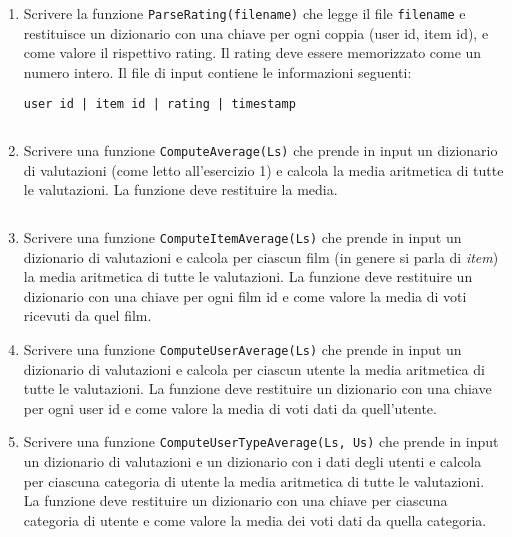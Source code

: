 \documentclass[11pt,a4]{article}
\newcommand{\mybox}[2]{$\quad$\fbox{
\begin{minipage}{#1cm}
\hfill\vspace{#2cm}
\end{minipage}
}}
\begin{document}
\begin{enumerate}
\item Scrivere la funzione {\tt ParseRating(filename)} che legge il file {\tt filename}
e restituisce un dizionario con una chiave per ogni coppia (user id, item id), e come valore il rispettivo rating. 
Il rating deve essere memorizzato come un numero intero.
Il file di input contiene le informazioni seguenti:
\begin{center}
{\tt user id | item id | rating | timestamp}
\end{center}

\mybox{15}{2}

\item Scrivere una funzione {\tt ComputeAverage(Ls)} che prende in input un dizionario di valutazioni (come letto all'esercizio 1) e calcola
la media aritmetica di tutte le valutazioni. La funzione deve restituire la media.

\mybox{15}{2}

\item Scrivere una funzione {\tt ComputeItemAverage(Ls)} che prende in input un dizionario di valutazioni e calcola
per ciascun film (in genere si parla di {\it item}) la media aritmetica di tutte le valutazioni. La funzione deve restituire un dizionario con una chiave
per ogni film id e come valore la media di voti ricevuti da quel film. 


\item Scrivere una funzione {\tt ComputeUserAverage(Ls)} che prende in input un dizionario di valutazioni e calcola
per ciascun utente la media aritmetica di tutte le valutazioni. La funzione deve restituire un dizionario con una chiave
per ogni user id e come valore la media di voti dati da quell'utente.


\item Scrivere una funzione {\tt ComputeUserTypeAverage(Ls, Us)} che prende in input un dizionario di valutazioni e un dizionario con i dati degli utenti e calcola
per ciascuna categoria di utente la media aritmetica di tutte le valutazioni. La funzione deve restituire un dizionario con una chiave
per ciascuna categoria di utente e come valore la media dei voti dati da quella categoria.



\end{enumerate}
\end{document}
